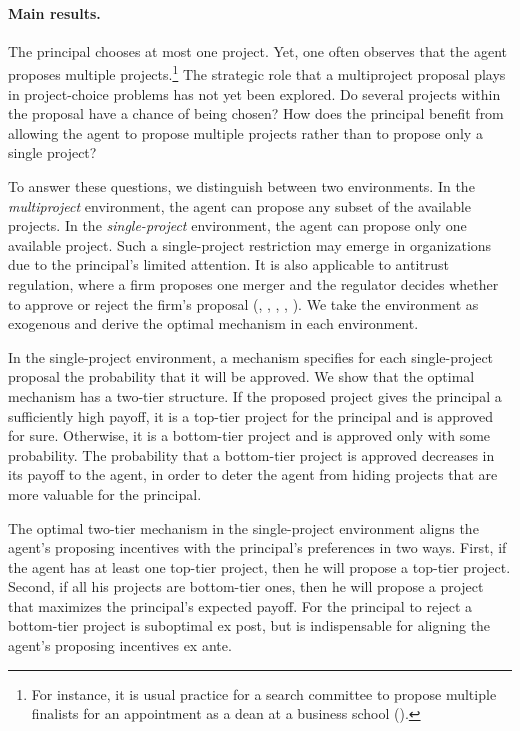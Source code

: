 \documentclass[12pt,english]{article}
\theoremstyle{remark}
\theoremstyle{plain}
\theoremstyle{definition}
\begin{document}
\vspace{-5 mm}
\paragraph{Main results.} The principal chooses at most one project. Yet, one often observes that the agent proposes multiple projects.\footnote{For instance, it is usual practice for a search committee to propose multiple finalists for an appointment as a dean at a business school (\cite{Byrne2018,Byrne2021}).\label{ft:multi}} The strategic role that a multiproject proposal plays in project-choice problems has not yet been explored. Do several projects within the proposal have a chance of being chosen? How does the principal benefit from allowing the agent to propose multiple projects rather than to propose only a single project?  

To answer these questions, we distinguish between two environments. In the \emph{multiproject} environment, the agent can propose any subset of the available projects. In the \emph{single-project} environment, the agent can propose only one available project. Such a single-project restriction may emerge in organizations due to the principal's limited attention. It is also applicable to antitrust regulation, where a firm proposes one merger and the regulator decides whether to approve or reject the firm's proposal (\cite{Lyons2003}, \cite{Neven2005}, \cite{ArmstrongVickers2010}, \cite{Ottaviani2011}, \cite{NockeWhinston}). We take the environment as exogenous and derive the optimal mechanism in each environment.


In the single-project environment, a mechanism specifies for each single-project proposal the probability that it will be approved. We show that the optimal mechanism has a two-tier structure. If the proposed project gives the principal a sufficiently high payoff, it is a top-tier project for the principal and is approved for sure. Otherwise, it is a bottom-tier project and is approved only with some probability. The probability that a bottom-tier project is approved decreases in its payoff to the agent, in order to deter the agent from hiding projects that are more valuable for the principal. 

The optimal two-tier mechanism in the single-project environment aligns the agent's proposing incentives with the principal's preferences in two ways. First, if the agent has at least one top-tier project, then he will propose a top-tier project. Second, if all his projects are bottom-tier ones, then he will propose a project that maximizes the principal's expected payoff. For the principal to reject a bottom-tier project is suboptimal ex post, but is indispensable for aligning the agent's proposing incentives ex ante.  
\end{document}
